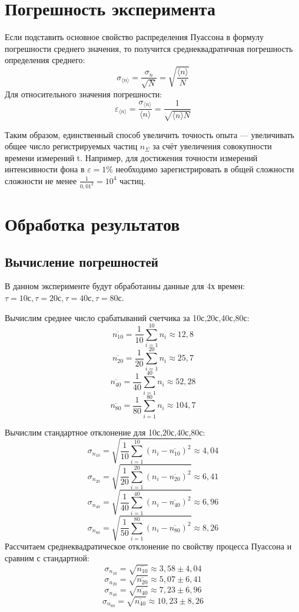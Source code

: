\documentclass[a4paper]{article}
\begin{document}
\section{Погрешность эксперимента}

Если подставить основное свойство распределения Пуассона в формулу погрешности среднего значения, то получится среднеквадратичная погрешность определения среднего:
\[\sigma_{\langle n \rangle} = \frac{\sigma_{n}}{\sqrt{N}} = \sqrt{\frac{\langle n \rangle}{N}}\]
Для относительного значения погрешности:
\[\varepsilon_{\langle n \rangle} = \frac{\sigma_{\langle n \rangle}}{\langle n \rangle} = \frac{1}{\sqrt{\langle n \rangle N}}\]

Таким образом, единственный способ увеличить точность опыта — увеличивать общее число регистрируемых частиц  $n_\Sigma$ за счёт увеличения совокупности времени измерений t. Например, для достижения точности измерений интенсивности фона в $\varepsilon = 1\%$ необходимо зарегистрировать в общей сложности сложности не менее $\frac{1}{0,01^{2}} = 10^{4}$ частиц.

\section{Обработка результатов}
\subsection{Вычисление погрешностей}

В данном эксперименте будут обработанны данные для 4х времен: $\tau = 10\text{с}, \tau = 20\text{с}, \tau = 40\text{с}, \tau = 80\text{с}$.



Вычислим среднее число срабатываний счетчика за 10с,20с,40с,80с:
\[\overline{n_{10}} = \frac{1}{10}\sum\limits_{i=1}^{10} n_{i} \approx 12,8\]
\[\overline{n_{20}} = \frac{1}{20}\sum\limits_{i=1}^{20} n_{i} \approx 25,7\]
\[\overline{n_{40}} = \frac{1}{40}\sum\limits_{i=1}^{40} n_{i} \approx 52,28\]
\[\overline{n_{80}} = \frac{1}{80}\sum\limits_{i=1}^{80} n_{i} \approx 104,7\]


Вычислим стандартное отклонение для 10с,20с,40с,80с:
\[\sigma_{n_{10}} = \sqrt{\frac{1}{10}\sum\limits_{i=1}^{10} (n_{i} - \overline{n_{10}})^2} \approx 4,04\]
\[\sigma_{n_{20}} = \sqrt{\frac{1}{20}\sum\limits_{i=1}^{20} (n_{i} - \overline{n_{20}})^2} \approx 6,41\]
\[\sigma_{n_{40}} = \sqrt{\frac{1}{40}\sum\limits_{i=1}^{40} (n_{i} - \overline{n_{40}})^2} \approx 6,96\]
\[\sigma_{n_{80}} = \sqrt{\frac{1}{50}\sum\limits_{i=1}^{80} (n_{i} - \overline{n_{80}})^2} \approx 8,26\]
Рассчитаем среднеквадратическое отклонение по свойству процесса Пуассона и сравним с стандартной:
\[\sigma_{n_{10}} = \sqrt{\overline{n_{10}}} \approx 3,58 \pm 4,04\]
\[\sigma_{n_{20}} = \sqrt{\overline{n_{20}}} \approx 5,07 \pm 6,41\]
\[\sigma_{n_{40}} = \sqrt{\overline{n_{40}}} \approx 7,23 \pm 6,96\]
\[\sigma_{n_{80}} = \sqrt{\overline{n_{40}}} \approx 10,23 \pm 8,26\]
\end{document}
